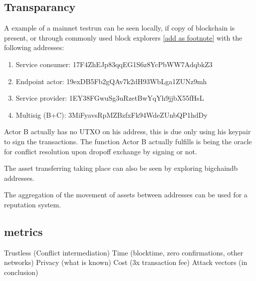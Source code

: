 \subsection{Transparancy}

A example of a mainnet testrun can be seen locally, if copy of blockchain is present, or through commonly used block explorers \href{https://www.blocktrail.com/BTC}{[add as footnote]}
 with the following addresses:
\begin{enumerate}
  \item Service consumer: 17F4ZhEJp83qqEG1S6z8YcPbWW7AdqbkZ3
  \item Endpoint actor: 19exDB5Fb2gQAv7k2dH93WbLga1ZUNz9mh
  \item Service provider: 1EY38FGwuSg3uRzetBwYqYh9jjbX55fHsL
  \item Multisig (B+C): 3MiFyavsRpMZBzfxFk94WdeZUnbQP1hdDy
\end{enumerate}

Actor B actually has no UTXO on his address, this is due only using his keypair to sign the transactions. The function Actor B actually fulfills is being the oracle for conflict resolution upon dropoff exchange by signing or not.\par
The asset transferring taking place can also be seen by exploring bigchaindb addresses. \par
The aggregation of the movement of assets between addresses can be used for a reputation system.

\subsection{metrics}

Trustless (Conflict intermediation)
Time (blocktime, zero confirmations, other networks)
Privacy (what is known)
Cost (3x transaction fee)
Attack vectors (in conclusion)
